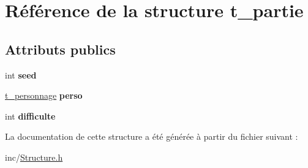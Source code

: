 \hypertarget{structt__partie}{}\section{Référence de la structure t\+\_\+partie}
\label{structt__partie}
\subsection*{Attributs publics}
\begin{DoxyCompactItemize}
\item 
\hypertarget{structt__partie_a90cae248c08231b5aa95cdf1097c2906}{}int {\bfseries seed}\label{structt__partie_a90cae248c08231b5aa95cdf1097c2906}

\item 
\hypertarget{structt__partie_a2a24a214a72345ec39aea8710ee96803}{}\hyperlink{structt__personnage}{t\+\_\+personnage} {\bfseries perso}\label{structt__partie_a2a24a214a72345ec39aea8710ee96803}

\item 
\hypertarget{structt__partie_a7991b31a9b9347548d396f3b6b9d1d5b}{}int {\bfseries difficulte}\label{structt__partie_a7991b31a9b9347548d396f3b6b9d1d5b}

\end{DoxyCompactItemize}


La documentation de cette structure a été générée à partir du fichier suivant \+:\begin{DoxyCompactItemize}
\item 
inc/\hyperlink{Structure_8h}{Structure.\+h}\end{DoxyCompactItemize}
